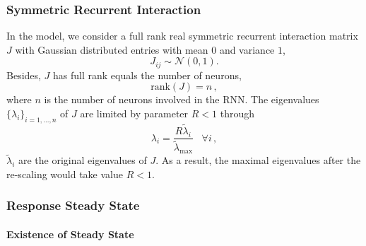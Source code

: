 \documentclass[11pt]{article}
\begin{document}
	\subsubsection{Symmetric Recurrent Interaction} \label{sec:symmetric_recurrent_interaction}
	In the model, we consider a full rank real symmetric recurrent interaction matrix $J$ with Gaussian distributed entries with mean $0$ and variance $1$,
		\begin{equation} \label{eq:gaussian_distribution}
			{J_{ij}} \sim \mathcal{N}(0, 1).
		\end{equation}
	Besides, $J$ has full rank equals the number of neurons, 
		\begin{equation}
			\text{rank} (J) = n \, , 
		\end{equation}
	where $n$ is the number of neurons involved in the RNN. The eigenvalues $\{\lambda_i\}_{i = 1,...,n}$ of $J$ are limited by parameter $R < 1$ through
		\begin{equation} \label{eq:eigval_normal}
			\lambda_i = \frac{R \tilde{\lambda}_i}{\tilde{\lambda}_{\text{max}}} \, \, \, \, \, \forall i \, ,
		\end{equation}
	$\tilde{\lambda}_i$ are the original eigenvalues of $J$. As a result, the maximal eigenvalues after the re-scaling would take value $R <1$.  
	
	\subsubsection{Response Steady State} \label{sec:steady_state_response_sym}
	
	\paragraph{Existence of Steady State}
	
\end{document}
